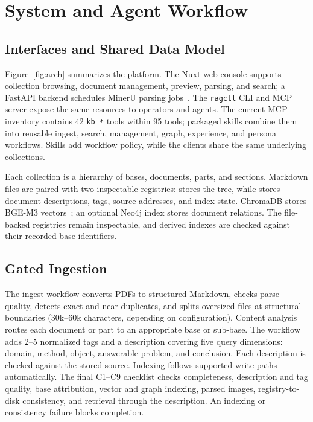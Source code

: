 \section{System and Agent Workflow}
\label{sec:system}

\subsection{Interfaces and Shared Data Model}
Figure~\ref{fig:arch} summarizes the platform. The Nuxt web console
supports collection browsing, document management, preview, parsing, and
search; a FastAPI backend schedules MinerU parsing jobs~\cite{mineru}.
The \texttt{ragctl} CLI and MCP server expose the same resources to
operators and agents. The current MCP inventory contains 42
\texttt{kb\_*} tools within 95 tools; packaged skills combine them into
reusable ingest, search, management, graph, experience, and persona
workflows. Skills add workflow policy, while the clients share the same
underlying collections.

Each collection is a hierarchy of bases, documents, parts, and sections.
Markdown files are paired with two inspectable registries:
 stores the tree, while 
stores document descriptions, tags, source addresses, and index state.
ChromaDB stores BGE-M3 vectors~\cite{bge-m3};
an optional Neo4j index stores document relations. The file-backed
registries remain inspectable, and derived indexes are checked against
their recorded base identifiers.

\subsection{Gated Ingestion}
The ingest workflow converts PDFs to structured Markdown, checks parse
quality, detects exact and near duplicates, and splits oversized files
at structural boundaries (30k--60k characters, depending on
configuration). Content analysis routes each document or part to an
appropriate base or sub-base. The workflow adds 2--5 normalized tags and
a description covering five query dimensions: domain, method, object,
answerable problem, and conclusion. Each description is checked against
the stored source. Indexing follows supported write paths automatically.
The final C1--C9 checklist checks completeness, description and tag
quality, base attribution, vector and graph indexing, parsed images,
registry-to-disk consistency, and retrieval through the description.
An indexing or consistency failure blocks completion.

